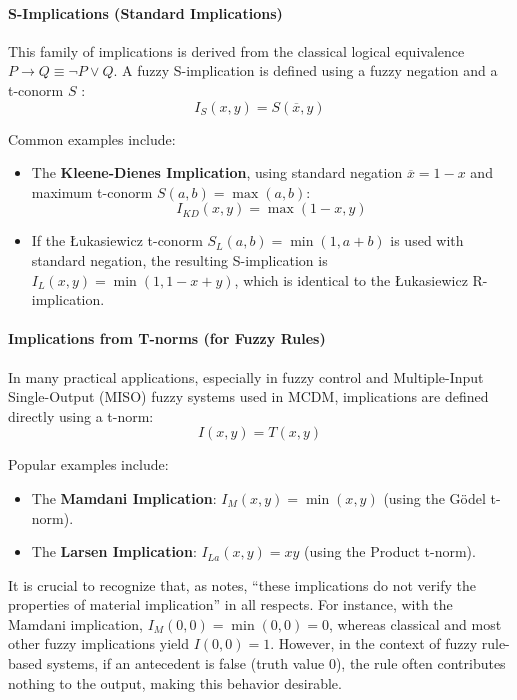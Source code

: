 \paragraph{S-Implications (Standard Implications)}
This family of implications is derived from the classical logical equivalence $P \rightarrow Q \equiv \neg P \lor Q$. A fuzzy S-implication is defined using a fuzzy negation and a t-conorm $S$ \cite[p.59]{FULLER2}:
\[I_S(x,y) = S(\overline{x}, y)\]
\begin{example}[S-Implications]
Common examples include:
\begin{itemize}
    \item The \textbf{Kleene-Dienes Implication}, using standard negation $\overline{x}=1-x$ and maximum t-conorm $S(a,b)=\max(a,b)$:
    \[I_{KD}(x,y) = \max(1-x, y)\]
    \item If the Łukasiewicz t-conorm $S_L(a,b) = \min(1, a+b)$ is used with standard negation, the resulting S-implication is $I_L(x,y) = \min(1, 1-x+y)$, which is identical to the Łukasiewicz R-implication.
\end{itemize}
\end{example}

\paragraph{Implications from T-norms (for Fuzzy Rules)}
In many practical applications, especially in fuzzy control and Multiple-Input Single-Output (MISO) fuzzy systems used in MCDM, implications are defined directly using a t-norm:
\[I(x,y) = T(x,y)\]
\begin{example}
Popular examples include:
\begin{itemize}
    \item The \textbf{Mamdani Implication}: $I_M(x,y) = \min(x,y)$ (using the Gödel t-norm).
    \item The \textbf{Larsen Implication}: $I_{La}(x,y) = xy$ (using the Product t-norm).
\end{itemize}
\end{example}
It is crucial to recognize that, as \cite[p.60]{FULLER2} notes, ``these implications do not verify the properties of material implication'' in all respects. For instance, with the Mamdani implication, $I_M(0,0) = \min(0,0) = 0$, whereas classical and most other fuzzy implications yield $I(0,0)=1$. However, in the context of fuzzy rule-based systems, if an antecedent is false (truth value 0), the rule often contributes nothing to the output, making this behavior desirable.

